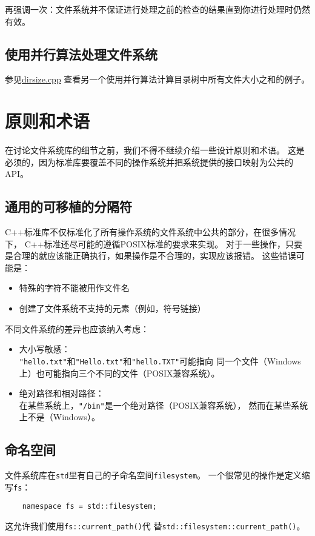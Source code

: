 再强调一次：文件系统并不保证进行处理之前的检查的结果直到你进行处理时仍然有效。

\subsection{使用并行算法处理文件系统}
参见\hyperref[ch22.6.1.4]{dirsize.cpp}
查看另一个使用并行算法计算目录树中所有文件大小之和的例子。


\section{原则和术语}
在讨论文件系统库的细节之前，我们不得不继续介绍一些设计原则和术语。
这是必须的，因为标准库要覆盖不同的操作系统并把系统提供的接口映射为公共的API。

\subsection{通用的可移植的分隔符}
C++标准库不仅标准化了所有操作系统的文件系统中公共的部分，在很多情况下，
C++标准还尽可能的遵循POSIX标准的要求来实现。
对于一些操作，只要是合理的就应该能正确执行，如果操作是不合理的，实现应该报错。
这些错误可能是：
\begin{itemize}
    \item 特殊的字符不能被用作文件名
    \item 创建了文件系统不支持的元素（例如，符号链接）
\end{itemize}
不同文件系统的差异也应该纳入考虑：
\begin{itemize}
    \item 大小写敏感：\\
    \texttt{"hello.txt"}和\texttt{"Hello.txt"}和\texttt{"hello.TXT"}可能指向
    同一个文件（Windows上）也可能指向三个不同的文件（POSIX兼容系统）。
    \item 绝对路径和相对路径：\\
    在某些系统上，\texttt{"/bin"}是一个绝对路径（POSIX兼容系统），
    然而在某些系统上不是（Windows）。
\end{itemize}

\subsection{命名空间}
文件系统库在\texttt{std}里有自己的子命名空间\texttt{filesystem}。
一个很常见的操作是定义缩写\texttt{fs}：
\begin{lstlisting}
    namespace fs = std::filesystem;
\end{lstlisting}
这允许我们使用\texttt{fs::current\_path()}代
替\texttt{std::filesystem::current\_path()}。

